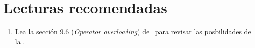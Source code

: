 \section{Lecturas recomendadas}

\begin{enumerate}

\item Lea la sección 9.6 (\emph{Operator overloading}) de~\cite{stroustrup:2014}
      para revisar las posbilidades de la .

\end{enumerate}
